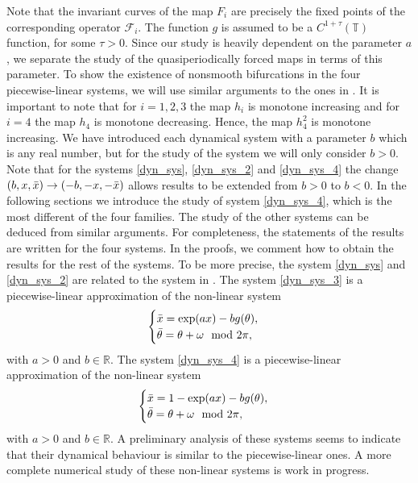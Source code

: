 \documentclass[12pt]{article}
\newcommand{\T}{\mathbb{T}}
\newcommand{\R}{\mathbb{R}}
\theoremstyle{plain}
\theoremstyle{remark}
\theoremstyle{definition}
\begin{document}
Note that the invariant curves of the map $F_i$ are precisely the fixed points of the corresponding operator $\mathcal{F}_i$. The function $g$ is assumed to be a $C^{1+\tau}(\T)$ function, for some $\tau>0$.
Since our study is heavily dependent on the parameter $a$, we separate the study of the quasiperiodically forced maps in terms of this parameter. To show the existence of nonsmooth bifurcations in the four piecewise-linear systems, we will use similar arguments to the ones in \cite{jorba2024nonsmooth}. It is important to note that for $i=1,2,3$ the map $h_i$ is monotone increasing and for $i=4$ the map $h_4$ is monotone decreasing. Hence, the map $h_4^2$ is monotone increasing. We have introduced each dynamical system with a parameter $b$ which is any real number, but for the study of the system we will only consider $b>0$. Note that for the systems \eqref{dyn_sys}, \eqref{dyn_sys_2} and \eqref{dyn_sys_4} the change $(b,x,\Bar{x})\to(-b,-x,-\Bar{x})$ allows results to be extended from $b>0$ to $b<0$. In the following sections we introduce the study of system \eqref{dyn_sys_4}, which is the most different of the four families. The study of the other systems can be deduced from similar arguments. For completeness, the statements of the results are written for the four systems. In the proofs, we comment how to obtain the results for the rest of the systems. To be more precise, the system \eqref{dyn_sys} and \eqref{dyn_sys_2} are related to the system in \cite{jorba2024nonsmooth}. The system \eqref{dyn_sys_3} is a piecewise-linear approximation of the non-linear system
\begin{align*}
    \begin{cases}
        \Bar{x} = \exp(ax) - b g(\theta),\\
        \Bar{\theta} = \theta + \omega \mod2\pi,
    \end{cases}
\end{align*}
with $a>0$ and $b\in\R$.
The system \eqref{dyn_sys_4} is a piecewise-linear approximation of the non-linear system
\begin{align}\label{dyn_nonlin_period}
    \begin{cases}
        \Bar{x} = 1-\exp(ax) - b g(\theta),\\
        \Bar{\theta} = \theta + \omega \mod2\pi,
    \end{cases}
\end{align}
with $a>0$ and $b\in\R$. A preliminary analysis of these systems seems to indicate that their dynamical behaviour is similar to the piecewise-linear
ones. A more complete numerical study of these non-linear systems is work in progress.
\end{document}
